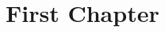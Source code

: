 \documentclass[working]{tuftebook}
\begin{document}
\chapter{First Chapter}
\renewcommand{\thepage}{\arabic{page}}
\pagestyle{normal}
\vspace{-2em}
\end{document}
